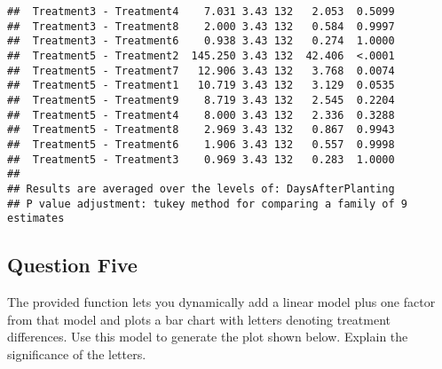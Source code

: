 \documentclass[
  12pt,
]{article}
\begin{document}
\begin{verbatim}
##  Treatment3 - Treatment4    7.031 3.43 132   2.053  0.5099
##  Treatment3 - Treatment8    2.000 3.43 132   0.584  0.9997
##  Treatment3 - Treatment6    0.938 3.43 132   0.274  1.0000
##  Treatment5 - Treatment2  145.250 3.43 132  42.406  <.0001
##  Treatment5 - Treatment7   12.906 3.43 132   3.768  0.0074
##  Treatment5 - Treatment1   10.719 3.43 132   3.129  0.0535
##  Treatment5 - Treatment9    8.719 3.43 132   2.545  0.2204
##  Treatment5 - Treatment4    8.000 3.43 132   2.336  0.3288
##  Treatment5 - Treatment8    2.969 3.43 132   0.867  0.9943
##  Treatment5 - Treatment6    1.906 3.43 132   0.557  0.9998
##  Treatment5 - Treatment3    0.969 3.43 132   0.283  1.0000
## 
## Results are averaged over the levels of: DaysAfterPlanting 
## P value adjustment: tukey method for comparing a family of 9 estimates
\end{verbatim}

\subsection{Question Five}\label{question-five}

The provided function lets you dynamically add a linear model plus one
factor from that model and plots a bar chart with letters denoting
treatment differences. Use this model to generate the plot shown below.
Explain the significance of the letters.
\end{document}
